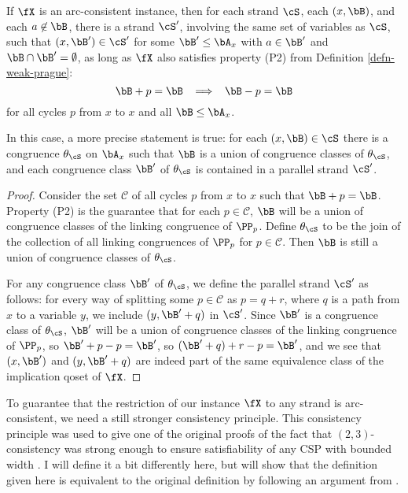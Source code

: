 \begin{prop} If $\fX$ is an arc-consistent instance, then for each strand $\cS$, each $(x,\bB)$, and each $a \not\in \bB$, there is a strand $\cS'$, involving the same set of variables as $\cS$, such that $(x,\bB') \in \cS'$ for some $\bB' \le \bA_x$ with $a \in \bB'$ and $\bB \cap \bB' = \emptyset$, as long as $\fX$ also satisfies property (P2) from Definition \ref{defn-weak-prague}:
\[
\bB + p = \bB \;\; \implies \;\; \bB - p = \bB
\]
for all cycles $p$ from $x$ to $x$ and all $\bB \le \bA_x$.

In this case, a more precise statement is true: for each $(x,\bB) \in \cS$ there is a congruence $\theta_\cS$ on $\bA_x$ such that $\bB$ is a union of congruence classes of $\theta_\cS$, and each congruence class $\bB'$ of $\theta_\cS$ is contained in a parallel strand $\cS'$.
\end{prop}
\begin{proof} Consider the set $\mathcal{C}$ of all cycles $p$ from $x$ to $x$ such that $\bB + p = \bB$. Property (P2) is the guarantee that for each $p \in \mathcal{C}$, $\bB$ will be a union of congruence classes of the linking congruence of $\PP_p$. Define $\theta_\cS$ to be the join of the collection of all linking congruences of $\PP_p$ for $p \in \mathcal{C}$. Then $\bB$ is still a union of congruence classes of $\theta_\cS$.

For any congruence class $\bB'$ of $\theta_\cS$, we define the parallel strand $\cS'$ as follows: for every way of splitting some $p \in \mathcal{C}$ as $p = q + r$, where $q$ is a path from $x$ to a variable $y$, we include $(y,\bB'+q)$ in $\cS'$. Since $\bB'$ is a congruence class of $\theta_\cS$, $\bB'$ will be a union of congruence classes of the linking congruence of $\PP_p$, so $\bB' + p - p = \bB'$, so $(\bB'+q) + r-p = \bB'$, and we see that $(x,\bB')$ and $(y,\bB'+q)$ are indeed part of the same equivalence class of the implication qoset of $\fX$.
\end{proof}

To guarantee that the restriction of our instance $\fX$ to any strand is arc-consistent, we need a still stronger consistency principle. This consistency principle was used to give one of the original proofs of the fact that $(2,3)$-consistency was strong enough to ensure satisfiability of any CSP with bounded width \cite{barto}. I will define it a bit differently here, but will show that the definition given here is equivalent to the original definition by following an argument from \cite{barto-conservative-revisited}.

